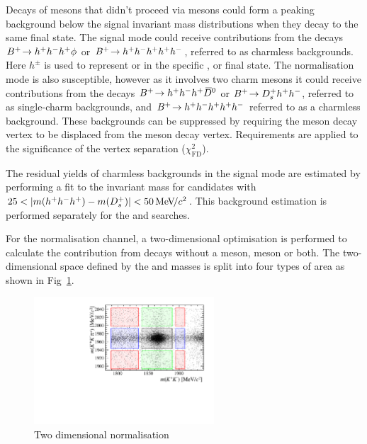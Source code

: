 Decays of \Bp mesons that didn't proceed via \D mesons could form a peaking background below the signal invariant mass distributions when they decay to the same final state.
The signal mode could receive contributions from the decays ${{{B}^+}}\!\rightarrow h^{+}h^{-}h^{+}\phi$ or ${{{B}^+}}\!\rightarrow h^{+}h^{-}h^{+}h^{+}h^{-}$, referred to as charmless backgrounds. Here $h^{\pm}$ is used to represent \Kpm or \pipm in the specific \Dsp, \Dzb or \phiz final state.
The normalisation mode is also susceptible, however as it involves two charm mesons it could receive contributions from the decays ${{{B}^+}}\!\rightarrow h^{+}h^{-}h^{+}{{\kern 0.2em\overline{\kern -0.2em D}{}}{}^0}$ or ${{{B}^+}}\!\rightarrow {\ensuremath{{D}^+_{s}}} h^{+}h^{-}$, referred to as single-charm backgrounds, and ${{{B}^+}}\!\rightarrow h^{+}h^{-}h^{+} h^{+}h^{-}$ referred to as a charmless background.
These backgrounds can be suppressed by requiring the \D meson decay vertex to be displaced from the \Bp meson decay vertex. Requirements are applied to the significance of the vertex separation ($\chi^{2}_{\text{FD}}$).

The residual yields of charmless backgrounds in the signal mode are estimated by performing a fit to the \Bp invariant mass for candidates with $25 < |m(h^{+}h^{-}h^{+}) - m({{D}^+_{s}})| < 50{\mathrm{\,Me\kern -0.1em V\!/}c^2} $. This background estimation is performed separately for the \decay{\Bp}{\Dsp\phiz} and \decay{\Bp}{\Dsp\Kp\Km} searches. 

For the \decay{\Bp}{\Dsp\Dzb} normalisation channel, a two-dimensional optimisation is performed to calculate the contribution from decays without a \Dsp meson, \Dzb meson or both. 
The two-dimensional space defined by the \Dsp and \Dzb masses is split into four types of area as shown in Fig~\ref{fig:2d_normalisation}.

\begin{figure}[!h]
    \centering
        \includegraphics[width=0.6\textwidth]{figs/Selection/B2DsD0_2D_mass_Ds2KKPiRun2.pdf}
        \caption{Two dimensional normalisation}
    \label{fig:2d_normalisation}   
\end{figure}

